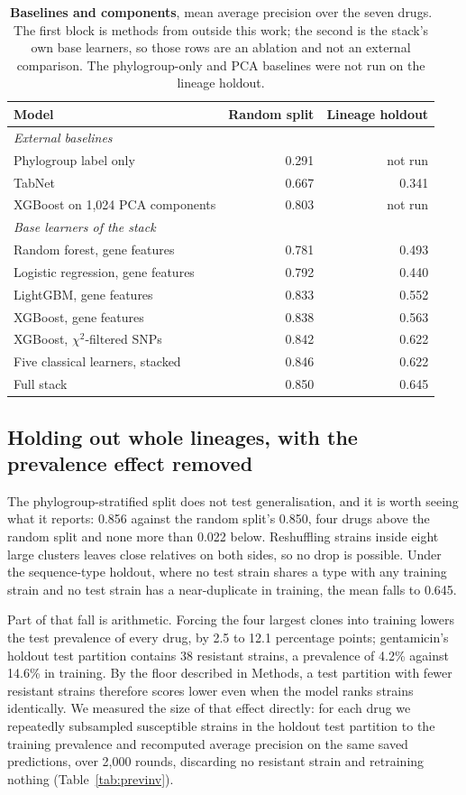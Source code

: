 \begin{table}[t]\centering\small
\caption{\textbf{Baselines and components}, mean average precision over the seven drugs. The first
block is methods from outside this work; the second is the stack's own base learners, so those rows
are an ablation and not an external comparison. The phylogroup-only and PCA baselines were not
run on the lineage holdout.}
\label{tab:baselines}
\begin{tabular}{lrr}
\toprule
Model & Random split & Lineage holdout \\
\midrule
\multicolumn{3}{l}{\textit{External baselines}} \\
Phylogroup label only & 0.291 & not run \\
TabNet & 0.667 & 0.341 \\
XGBoost on 1,024 PCA components & 0.803 & not run \\
\midrule
\multicolumn{3}{l}{\textit{Base learners of the stack}} \\
Random forest, gene features & 0.781 & 0.493 \\
Logistic regression, gene features & 0.792 & 0.440 \\
LightGBM, gene features & 0.833 & 0.552 \\
XGBoost, gene features & 0.838 & 0.563 \\
XGBoost, $\chi^2$-filtered SNPs & 0.842 & 0.622 \\
Five classical learners, stacked & 0.846 & 0.622 \\
\midrule
Full stack & 0.850 & 0.645 \\
\bottomrule
\end{tabular}
\end{table}

\subsection*{Holding out whole lineages, with the prevalence effect removed}

The phylogroup-stratified split does not test generalisation, and it is worth seeing what it
reports: 0.856 against the random split's 0.850, four drugs above the random split and none more
than 0.022 below. Reshuffling strains inside eight large clusters leaves close relatives on both
sides, so no drop is possible. Under the sequence-type holdout, where no test strain shares a type
with any training strain and no test strain has a near-duplicate in training, the mean falls to
0.645.

Part of that fall is arithmetic. Forcing the four largest clones into training lowers the test
prevalence of every drug, by 2.5 to 12.1 percentage points; gentamicin's holdout test partition
contains 38 resistant strains, a prevalence of 4.2\% against 14.6\% in training. By the floor
described in Methods, a test partition with fewer resistant strains therefore scores lower even
when the model ranks strains identically. We measured the size of that effect
directly: for each drug we repeatedly subsampled susceptible strains in the holdout test partition
to the training prevalence and recomputed average precision on the same saved predictions, over
2,000 rounds, discarding no resistant strain and retraining nothing (Table~\ref{tab:previnv}).

